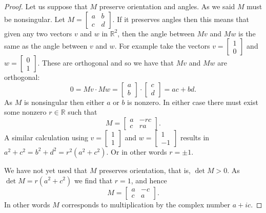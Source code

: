 \documentclass[12pt,openany]{book}
\newcommand{\R}{{\mathbb{R}}}
\theoremstyle{plain}
\theoremstyle{remark}
\theoremstyle{definition}
\theoremstyle{exercise}
\theoremstyle{example}
\begin{document}
\begin{proof}
Let us suppose that $M$ preserve orientation and angles.
As we said $M$ must be nonsingular.
Let $M =
\left[\begin{smallmatrix}a&b\\c&d\end{smallmatrix}\right]$.
If it preserves angles then this means that given any two vectors $v$ and
$w$ in $\R^2$, then the angle between $Mv$ and $Mw$ is the same as the angle
between $v$ and $w$.  For example take the vectors
$v=\left[\begin{smallmatrix}1\\0\end{smallmatrix}\right]$ and
$w=\left[\begin{smallmatrix}0\\1\end{smallmatrix}\right]$.  These are
orthogonal and so we have that $Mv$ and $Mw$ are orthogonal:
\begin{equation*}
0 = Mv \cdot Mw = 
\begin{bmatrix} a\\b \end{bmatrix}
\cdot
\begin{bmatrix} c\\d \end{bmatrix}
=
ac+bd .
\end{equation*}
As $M$ is nonsingular then either $a$ or $b$ is nonzero.  In either case 
there must exist some nonzero $r \in \R$ such that
\begin{equation*}
M =
\begin{bmatrix}
a &-rc \\
c & ra
\end{bmatrix} .
\end{equation*}
A similar calculation using
$v=\left[\begin{smallmatrix}1\\1\end{smallmatrix}\right]$ and
$w=\left[\begin{smallmatrix}1\\-1\end{smallmatrix}\right]$ results in
$a^2+c^2 = b^2+d^2 = r^2(a^2+c^2)$.  Or in other words $r=\pm 1$.

We have not yet used that $M$ preserves orientation, that is, $\det M > 0$.
As $\det M = r(a^2+c^2)$ we find that $r=1$, and hence
\begin{equation*}
M =
\begin{bmatrix}
a & -c \\
c &  a
\end{bmatrix} .
\end{equation*}
In other words $M$ corresponds to multiplication by the complex number
$a+ic$.


\end{proof}
\end{document}

